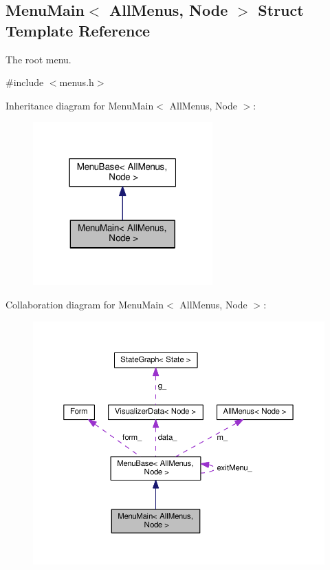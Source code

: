 \hypertarget{structMenuMain}{}\subsection{Menu\+Main$<$ All\+Menus, Node $>$ Struct Template Reference}
\label{structMenuMain}


The root menu.  




{\ttfamily \#include $<$menus.\+h$>$}



Inheritance diagram for Menu\+Main$<$ All\+Menus, Node $>$\+:\nopagebreak
\begin{figure}[H]
\begin{center}
\leavevmode
\includegraphics[width=196pt]{structMenuMain__inherit__graph}
\end{center}
\end{figure}


Collaboration diagram for Menu\+Main$<$ All\+Menus, Node $>$\+:\nopagebreak
\begin{figure}[H]
\begin{center}
\leavevmode
\includegraphics[width=350pt]{structMenuMain__coll__graph}
\end{center}
\end{figure}
